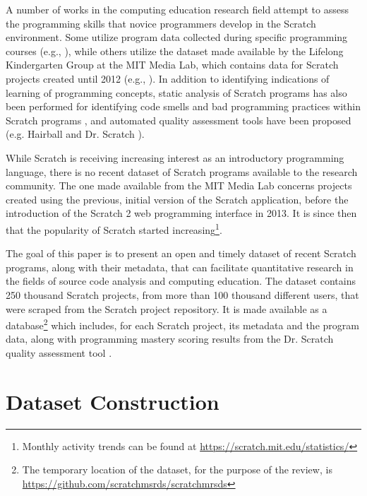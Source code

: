 \documentclass[10pt, conference]{IEEEtran}
\begin{document}
A number of works in the computing education research field attempt to assess the programming skills that novice programmers develop in the Scratch environment.
Some utilize program data collected during specific programming courses (e.g., \cite{meerbaum-salant_learning_2010, wilson_evaluation_2012, Maloney_2008}), while others utilize the dataset made available by the Lifelong Kindergarten Group at the MIT Media Lab, which contains data for Scratch projects created until 2012 (e.g., \cite{fields_2014, yang_2015, Dasgupta_2016}).
In addition to identifying indications of learning of programming concepts, static analysis of Scratch programs has also been performed for identifying code smells and bad programming practices within Scratch programs \cite{Meerbaum_habits_2011, Aivaloglou_2016}, and automated quality assessment tools have been proposed (e.g. Hairball \cite{boe_hairball:_2013} and Dr. Scratch \cite{moreno_automatic_2014}).

While Scratch is receiving increasing interest as an introductory programming language, there is no recent dataset of Scratch programs available to the research community.
The one made available from the MIT Media Lab concerns projects created using the previous, initial version of the Scratch application, before the introduction of the Scratch 2 web programming interface in 2013.
It is since then that the popularity of Scratch started increasing\footnote{Monthly activity trends can be found at \url{https://scratch.mit.edu/statistics/}}.

The goal of this paper is to present an open and timely dataset of recent Scratch programs, along with their metadata, that can facilitate quantitative research in the fields of source code analysis and computing education.
The dataset contains 250 thousand Scratch projects, from more than 100 thousand different users, that were scraped from the Scratch project repository.
It is made available as a database\footnote{\label{dataseturl}The temporary location of the dataset, for the purpose of the review, is \url{https://github.com/scratchmsrds/scratchmrsds}} which includes, for each Scratch project, its metadata and the program data, along with programming mastery scoring results from the Dr. Scratch quality assessment tool \cite{moreno_automatic_2014}.

\section{Dataset Construction}
\label{dataset}
\end{document}
